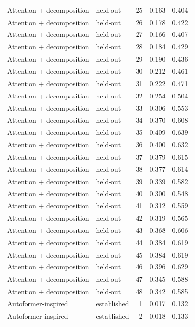 \begin{tabular}{llrrr}
Attention + decomposition & held-out & 25 & 0.163 & 0.404 \\
Attention + decomposition & held-out & 26 & 0.178 & 0.422 \\
Attention + decomposition & held-out & 27 & 0.166 & 0.407 \\
Attention + decomposition & held-out & 28 & 0.184 & 0.429 \\
Attention + decomposition & held-out & 29 & 0.190 & 0.436 \\
Attention + decomposition & held-out & 30 & 0.212 & 0.461 \\
Attention + decomposition & held-out & 31 & 0.222 & 0.471 \\
Attention + decomposition & held-out & 32 & 0.254 & 0.504 \\
Attention + decomposition & held-out & 33 & 0.306 & 0.553 \\
Attention + decomposition & held-out & 34 & 0.370 & 0.608 \\
Attention + decomposition & held-out & 35 & 0.409 & 0.639 \\
Attention + decomposition & held-out & 36 & 0.400 & 0.632 \\
Attention + decomposition & held-out & 37 & 0.379 & 0.615 \\
Attention + decomposition & held-out & 38 & 0.377 & 0.614 \\
Attention + decomposition & held-out & 39 & 0.339 & 0.582 \\
Attention + decomposition & held-out & 40 & 0.300 & 0.548 \\
Attention + decomposition & held-out & 41 & 0.312 & 0.559 \\
Attention + decomposition & held-out & 42 & 0.319 & 0.565 \\
Attention + decomposition & held-out & 43 & 0.368 & 0.606 \\
Attention + decomposition & held-out & 44 & 0.384 & 0.619 \\
Attention + decomposition & held-out & 45 & 0.384 & 0.619 \\
Attention + decomposition & held-out & 46 & 0.396 & 0.629 \\
Attention + decomposition & held-out & 47 & 0.345 & 0.588 \\
Attention + decomposition & held-out & 48 & 0.342 & 0.585 \\
Autoformer-inspired & established & 1 & 0.017 & 0.132 \\
Autoformer-inspired & established & 2 & 0.018 & 0.133 \\

\end{tabular}

